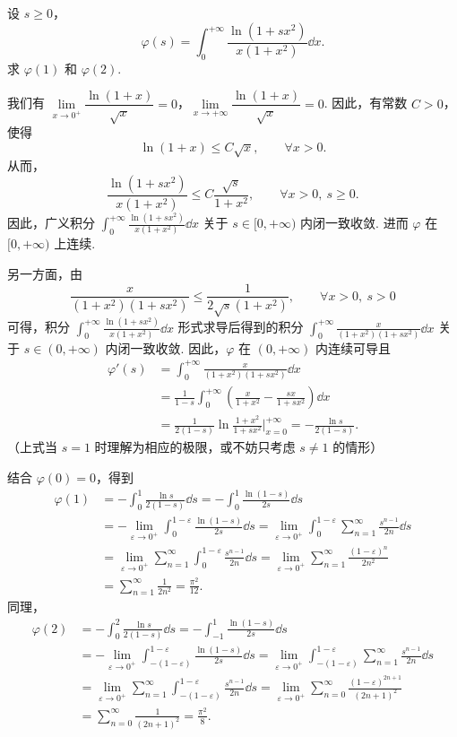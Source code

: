 设 $s\ge0$，
\[
  \varphi(s)=\int_0^{+\infty}\frac{\ln(1+sx^2)}{x(1+x^2)}\dd x.
\]
求 $\varphi(1)$ 和 $\varphi(2)$.
\begin{solution}
我们有 $\lim\limits_{x\to0^+}\dfrac{\ln(1+x)}{\sqrt{x}}=0$，$\lim\limits_{x\to+\infty}\dfrac{\ln(1+x)}{\sqrt{x}}=0$. 因此，有常数 $C>0$，使得
\[
  \ln(1+x)\le C\sqrt{x},\qquad \forall x>0.
\]
从而，
\[
  \frac{\ln(1+sx^2)}{x(1+x^2)}\le C\frac{\sqrt{s}}{1+x^2},\qquad \forall x>0,\ s\ge0.
\]
因此，广义积分 $\displaystyle\int_0^{+\infty}\frac{\ln(1+sx^2)}{x(1+x^2)}\dd x$ 关于 $s\in[0,+\infty)$ 内闭一致收敛. 进而 $\varphi$ 在 $[0,+\infty)$ 上连续.

另一方面，由
\[
  \frac{x}{(1+x^2)(1+sx^2)}\le\frac{1}{2\sqrt{s}(1+x^2)},\qquad \forall x>0,\ s>0
\]
可得，积分 $\displaystyle\int_0^{+\infty}\frac{\ln(1+sx^2)}{x(1+x^2)}\dd x$ 形式求导后得到的积分 $\displaystyle\int_0^{+\infty}\frac{x}{(1+x^2)(1+sx^2)}\dd x$ 关于 $s\in(0,+\infty)$ 内闭一致收敛. 因此，$\varphi$ 在 $(0,+\infty)$ 内连续可导且
\begin{align*}
\varphi'(s)&=\int_0^{+\infty}\frac{x}{(1+x^2)(1+sx^2)}\dd x\\
&=\frac{1}{1-s}\int_0^{+\infty}\left(\frac{x}{1+x^2}-\frac{sx}{1+sx^2}\right)\dd x\\
&=\frac{1}{2(1-s)}\ln\frac{1+x^2}{1+sx^2}\Big|_{x=0}^{+\infty}=-\frac{\ln s}{2(1-s)}.
\end{align*}
（上式当 $s=1$ 时理解为相应的极限，或不妨只考虑 $s\ne1$ 的情形）

结合 $\varphi(0)=0$，得到
\begin{align*}
\varphi(1)&=-\int_0^1\frac{\ln s}{2(1-s)}\dd s=-\int_0^1\frac{\ln(1-s)}{2s}\dd s\\
&=-\lim_{\varepsilon\to0^+}\int_0^{1-\varepsilon}\frac{\ln(1-s)}{2s}\dd s=\lim_{\varepsilon\to0^+}\int_0^{1-\varepsilon}\sum_{n=1}^{\infty}\frac{s^{n-1}}{2n}\dd s\\
&=\lim_{\varepsilon\to0^+}\sum_{n=1}^{\infty}\int_0^{1-\varepsilon}\frac{s^{n-1}}{2n}\dd s=\lim_{\varepsilon\to0^+}\sum_{n=1}^{\infty}\frac{(1-\varepsilon)^n}{2n^2}\\
&=\sum_{n=1}^{\infty}\frac{1}{2n^2}=\frac{\pi^2}{12}.
\end{align*}
同理，
\begin{align*}
\varphi(2)&=-\int_0^2\frac{\ln s}{2(1-s)}\dd s=-\int_{-1}^1\frac{\ln(1-s)}{2s}\dd s\\
&=-\lim_{\varepsilon\to0^+}\int_{-(1-\varepsilon)}^{1-\varepsilon}\frac{\ln(1-s)}{2s}\dd s=\lim_{\varepsilon\to0^+}\int_{-(1-\varepsilon)}^{1-\varepsilon}\sum_{n=1}^{\infty}\frac{s^{n-1}}{2n}\dd s\\
&=\lim_{\varepsilon\to0^+}\sum_{n=1}^{\infty}\int_{-(1-\varepsilon)}^{1-\varepsilon}\frac{s^{n-1}}{2n}\dd s=\lim_{\varepsilon\to0^+}\sum_{n=0}^{\infty}\frac{(1-\varepsilon)^{2n+1}}{(2n+1)^2}\\
&=\sum_{n=0}^{\infty}\frac{1}{(2n+1)^2}=\frac{\pi^2}{8}.
\end{align*}


\end{solution}
